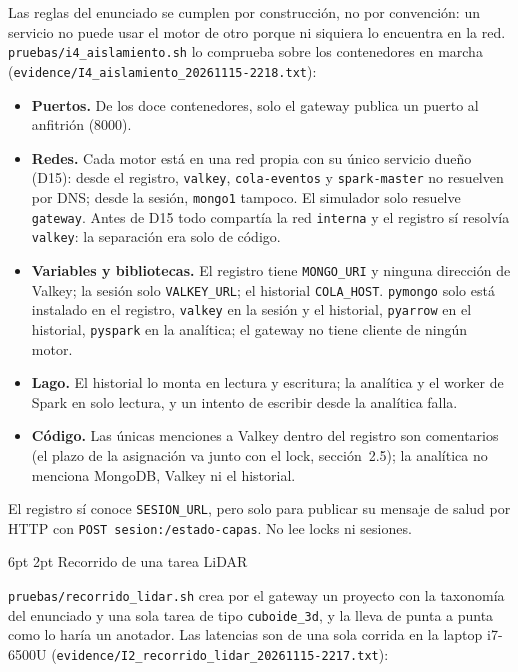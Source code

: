 \documentclass[10pt,letterpaper]{article}
\makeatletter
\newcommand{\ev}[1]{{\footnotesize\texttt{evidence/\allowbreak #1}}}
\renewcommand\subsection{\@startsection{subsection}{2}{\z@}%
  {6pt \@plus 1pt}{2pt}%
  {\normalfont\normalsize\bfseries\color{acc}}}
\makeatother
\begin{document}
Las reglas del enunciado se cumplen por construcción, no por convención: un servicio no puede usar el
motor de otro porque ni siquiera lo encuentra en la red. \texttt{pruebas/i4\_aislamiento.sh} lo comprueba
sobre los contenedores en marcha (\ev{I4\_aislamiento\_20261115-2218.txt}):
\begin{itemize}\setlength{\itemsep}{1pt}
\item \textbf{Puertos.} De los doce contenedores, solo el gateway publica un puerto al anfitrión (8000).
\item \textbf{Redes.} Cada motor está en una red propia con su único servicio dueño (D15): desde el registro,
\texttt{valkey}, \texttt{cola-eventos} y \texttt{spark-master} no resuelven por DNS; desde la sesión,
\texttt{mongo1} tampoco. El simulador solo resuelve \texttt{gateway}. Antes de D15 todo compartía la red
\texttt{interna} y el registro sí resolvía \texttt{valkey}: la separación era solo de código.
\item \textbf{Variables y bibliotecas.} El registro tiene \texttt{MONGO\_URI} y ninguna dirección de Valkey;
la sesión solo \texttt{VALKEY\_URL}; el historial \texttt{COLA\_HOST}. \texttt{pymongo} solo está instalado en
el registro, \texttt{valkey} en la sesión y el historial, \texttt{pyarrow} en el historial, \texttt{pyspark}
en la analítica; el gateway no tiene cliente de ningún motor.
\item \textbf{Lago.} El historial lo monta en lectura y escritura; la analítica y el worker de Spark en solo
lectura, y un intento de escribir desde la analítica falla.
\item \textbf{Código.} Las únicas menciones a Valkey dentro del registro son comentarios (el plazo de la
asignación va junto con el lock, sección~2.5); la analítica no menciona MongoDB, Valkey ni el historial.
\end{itemize}
El registro sí conoce \texttt{SESION\_URL}, pero solo para publicar su mensaje de salud por HTTP
con \texttt{POST sesion:/estado-capas}. No lee locks ni sesiones.

\subsection{Recorrido de una tarea LiDAR}

\texttt{pruebas/recorrido\_lidar.sh} crea por el gateway un proyecto con la taxonomía del enunciado y una
sola tarea de tipo \texttt{cuboide\_3d}, y la lleva de punta a punta como lo haría un anotador. Las
latencias son de una sola corrida en la laptop i7-6500U (\ev{I2\_recorrido\_lidar\_20261115-2217.txt}):
\end{document}
